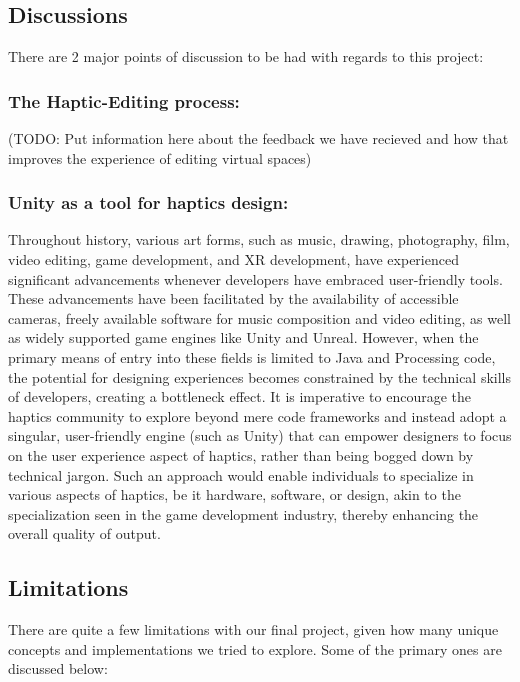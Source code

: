 \subsection{Discussions}

There are 2 major points of discussion to be had with regards to this project:
\subsubsection{The Haptic-Editing process:}

(TODO: Put information here about the feedback we have recieved and how that improves the experience of editing virtual spaces)

\subsubsection{Unity as a tool for haptics design:}

Throughout history, various art forms, such as music, drawing, photography, film, video editing, game development, and XR development, have experienced significant advancements whenever developers have embraced user-friendly tools. These advancements have been facilitated by the availability of accessible cameras, freely available software for music composition and video editing, as well as widely supported game engines like Unity and Unreal. However, when the primary means of entry into these fields is limited to Java and Processing code, the potential for designing experiences becomes constrained by the technical skills of developers, creating a bottleneck effect. It is imperative to encourage the haptics community to explore beyond mere code frameworks and instead adopt a singular, user-friendly engine (such as Unity) that can empower designers to focus on the user experience aspect of haptics, rather than being bogged down by technical jargon. Such an approach would enable individuals to specialize in various aspects of haptics, be it hardware, software, or design, akin to the specialization seen in the game development industry, thereby enhancing the overall quality of output.

\subsection{Limitations}

There are quite a few limitations with our final project, given how many unique concepts and implementations we tried to explore. Some of the primary ones are discussed below:

